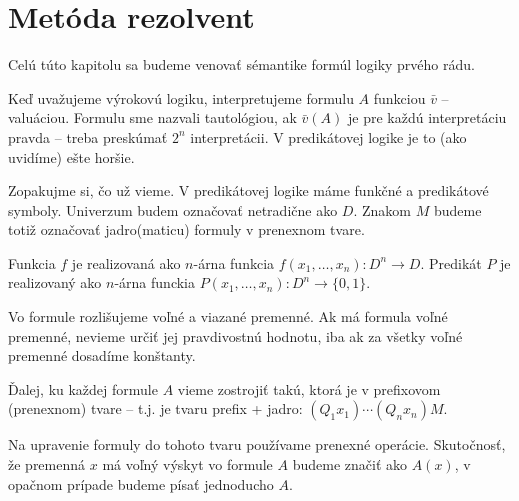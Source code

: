 \section{Metóda rezolvent}

Celú túto kapitolu sa budeme venovať sémantike formúl logiky prvého
rádu.

Keď uvažujeme výrokovú logiku, interpretujeme formulu $A$ funkciou
$\bar{v}$ -- valuáciou.
Formulu sme nazvali tautológiou, ak $\bar{v}(A)$ je pre každú
interpretáciu pravda -- treba preskúmať $2^n$ interpretácii.
V predikátovej logike je to (ako uvidíme) ešte horšie.

Zopakujme si, čo už vieme. V predikátovej logike máme funkčné a
predikátové symboly. Univerzum budem označovať netradične ako $D$.
Znakom $M$ budeme totiž označovať jadro(maticu) formuly v prenexnom
tvare.

Funkcia $f$ je realizovaná ako $n$-árna funkcia 
$f(x_1,\dots,x_n): D^n \rightarrow D$.
Predikát $P$ je realizovaný ako $n$-árna funckia
$P(x_1,\dots,x_n): D^n \rightarrow \{0,1\}$.

Vo formule rozlišujeme voľné a viazané premenné.
Ak má formula voľné premenné, nevieme určiť jej pravdivostnú hodnotu,
iba ak za všetky voľné premenné dosadíme konštanty.

Ďalej, ku každej formule $A$ vieme zostrojiť takú,
ktorá je v prefixovom (prenexnom) tvare -- t.j. je tvaru
prefix + jadro: $(Q_1 x_1)\cdots(Q_n x_n)M$.

Na upravenie formuly do tohoto tvaru používame prenexné operácie.
Skutočnosť, že premenná $x$ má voľný výskyt vo formule $A$ budeme
značiť ako $A(x)$, v opačnom prípade budeme písať jednoducho $A$.


